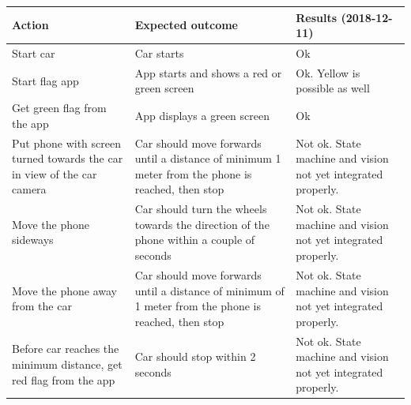 \documentclass[11pt, titlepage]{article} %
\begin{document}
\begin{table}[H]
 \label{tab:title}
\centering
\begin{tabular}{|m{5cm}|m{5cm}|m{5cm}|}
\hline
Action & Expected outcome & Results (2018-12-11) \\ \hline
Start car  &  Car starts     & Ok  \\ \hline
Start flag app  & App starts and shows a red or green screen      & Ok. Yellow is possible as well \\ \hline
Get green flag from the app  & App displays a green screen      & Ok  \\ \hline
Put phone with screen turned towards the car in view of the car camera  & Car should move forwards until a distance of minimum 1 meter from the phone is reached, then stop      & Not ok. State machine and vision not yet integrated properly.  \\ \hline
Move the phone sideways  & Car should turn the wheels towards the direction of the phone within a couple of seconds      & Not ok. State machine and vision not yet integrated properly.  \\ \hline
Move the phone away from the car  & Car should move forwards until a distance of minimum of 1 meter from the phone is reached, then stop      & Not ok. State machine and vision not yet integrated properly.  \\ \hline
Before car reaches the minimum distance, get red flag from the app  & Car should stop within 2 seconds      & Not ok. State machine and vision not yet integrated properly.  \\ \hline
\end{tabular}
\end{table}
  
\end{document}
